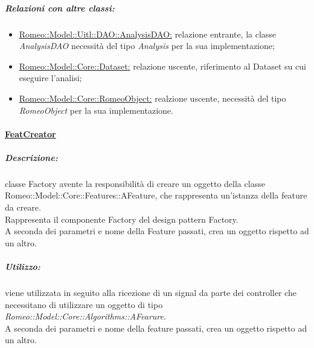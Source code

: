 		\subparagraph{Relazioni con altre classi:}
			\begin{itemize}
				\item \hyperref[]{Romeo::Model::Uitl::DAO::AnalysisDAO:} relazione entrante, la classe \textsl{AnalysisDAO} necessità del tipo \textsl{Analysis} per la sua implementazione;
				\item \hyperref[dataset]{Romeo::Model::Core::Dataset:} relazione uscente, riferimento al Dataset\g{} su cui eseguire l'analisi;
				\item \hyperref[]{Romeo::Model::Core::RomeoObject:} realzione uscente, necessità del tipo \textsl{RomeoObject} per la sua implementazione.
			\end{itemize}

		\paragraph{\underline{FeatCreator}} 
		\label{featC}
		
			\subparagraph{Descrizione:} classe Factory avente la responsibilità di creare un oggetto della classe Romeo::Model::Core::Features::AFeature, che rappresenta un'istanza della feature\glossario{} da creare.
			\\Rappresenta il componente Factory del design pattern\g{} Factory.
			\\A seconda dei parametri e nome della Feature\g{} passati, crea un oggetto rispetto ad un altro.
			
			\subparagraph{Utilizzo: } viene utilizzata in seguito alla ricezione di un signal\g{} da parte dei controller che necessitano di utilizzare un oggetto di tipo \textsl{Romeo::Model::Core::Algorithms::AFearure}.
			\\A seconda dei parametri e nome della feature\g{} passati, crea un oggetto rispetto ad un altro.
			
